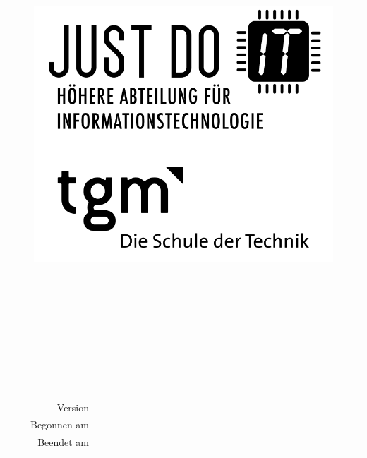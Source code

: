 
\begin{titlepage}

	\begin{figure}[!h]
		\begin{flushright}
			\includegraphics[width=0.3\linewidth]{images/jdIT_tgm.png}
		\end{flushright}
	\end{figure}

	\vspace{1.5cm} 

	{\begin{center} \bfseries\huge
			\rule{17.5cm}{0.1mm}  
			\\[5mm]
			\mytitle\\[5mm]
			\mythema\\
			\rule{17.5cm}{0.1mm}  
	\end{center}}

	{\begin{flushright} \bfseries\Large
			\vspace{2cm}
			\mysubject\\
			\mycourse\\[10mm]
			\myauthor\\[10mm]
	\end{flushright}}

	{\begin{table}[!h] \bfseries\normalsize
		\begin{tabularx}{\textwidth}{lXr @{\hspace{0mm}}}
			&& Version \myversion\\
			\mygrade && Begonnen am \mybegin\\
			\myteacher && Beendet am \myfinish\\
		\end{tabularx}
	\end{table}}

\end{titlepage}

